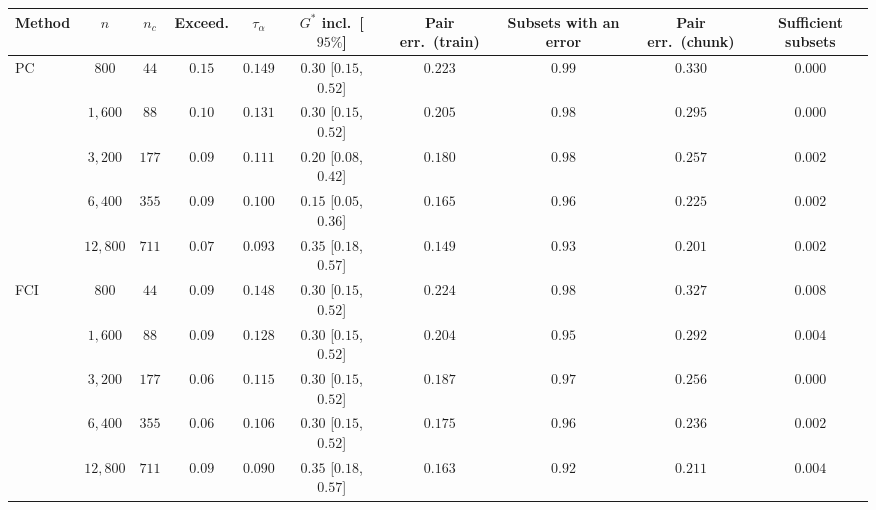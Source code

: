 \begin{tabular}{lccccccccc}
\toprule
Method & $n$ & $n_c$ & Exceed. & $\tau_\alpha$ & $G^\ast$ incl.\ [$95\%$] & Pair err.\ (train) & Subsets with an error & Pair err.\ (chunk) & Sufficient subsets \\
\midrule
PC & $800$ & $44$ & $0.15$ & $0.149$ & $0.30$ [$0.15$, $0.52$] & $0.223$ & $0.99$ & $0.330$ & $0.000$ \\
 & $1{,}600$ & $88$ & $0.10$ & $0.131$ & $0.30$ [$0.15$, $0.52$] & $0.205$ & $0.98$ & $0.295$ & $0.000$ \\
 & $3{,}200$ & $177$ & $0.09$ & $0.111$ & $0.20$ [$0.08$, $0.42$] & $0.180$ & $0.98$ & $0.257$ & $0.002$ \\
 & $6{,}400$ & $355$ & $0.09$ & $0.100$ & $0.15$ [$0.05$, $0.36$] & $0.165$ & $0.96$ & $0.225$ & $0.002$ \\
 & $12{,}800$ & $711$ & $0.07$ & $0.093$ & $0.35$ [$0.18$, $0.57$] & $0.149$ & $0.93$ & $0.201$ & $0.002$ \\
\midrule
FCI & $800$ & $44$ & $0.09$ & $0.148$ & $0.30$ [$0.15$, $0.52$] & $0.224$ & $0.98$ & $0.327$ & $0.008$ \\
 & $1{,}600$ & $88$ & $0.09$ & $0.128$ & $0.30$ [$0.15$, $0.52$] & $0.204$ & $0.95$ & $0.292$ & $0.004$ \\
 & $3{,}200$ & $177$ & $0.06$ & $0.115$ & $0.30$ [$0.15$, $0.52$] & $0.187$ & $0.97$ & $0.256$ & $0.000$ \\
 & $6{,}400$ & $355$ & $0.06$ & $0.106$ & $0.30$ [$0.15$, $0.52$] & $0.175$ & $0.96$ & $0.236$ & $0.002$ \\
 & $12{,}800$ & $711$ & $0.09$ & $0.090$ & $0.35$ [$0.18$, $0.57$] & $0.163$ & $0.92$ & $0.211$ & $0.004$ \\
\bottomrule
\end{tabular}
